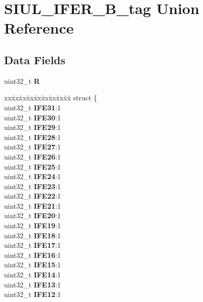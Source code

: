 \hypertarget{unionSIUL__IFER__32B__tag}{}\section{S\+I\+U\+L\+\_\+\+I\+F\+E\+R\+\_\+B\+\_\+tag Union Reference}
\label{unionSIUL__IFER__32B__tag}
\subsection*{Data Fields}
\begin{DoxyCompactItemize}
\item 
\mbox{\label{unionSIUL__IFER__32B__tag_ab50f2e33a8a047076a4418fd898069c3}} 
uint32\+\_\+t {\bfseries R}
\item 
\mbox{\label{unionSIUL__IFER__32B__tag_af816b953a23317ece501f2658c3ec8c3}} 
\begin{tabbing}
xx\=xx\=xx\=xx\=xx\=xx\=xx\=xx\=xx\=\kill
struct \{\\
\>uint32\_t {\bfseries IFE31}:1\\
\>uint32\_t {\bfseries IFE30}:1\\
\>uint32\_t {\bfseries IFE29}:1\\
\>uint32\_t {\bfseries IFE28}:1\\
\>uint32\_t {\bfseries IFE27}:1\\
\>uint32\_t {\bfseries IFE26}:1\\
\>uint32\_t {\bfseries IFE25}:1\\
\>uint32\_t {\bfseries IFE24}:1\\
\>uint32\_t {\bfseries IFE23}:1\\
\>uint32\_t {\bfseries IFE22}:1\\
\>uint32\_t {\bfseries IFE21}:1\\
\>uint32\_t {\bfseries IFE20}:1\\
\>uint32\_t {\bfseries IFE19}:1\\
\>uint32\_t {\bfseries IFE18}:1\\
\>uint32\_t {\bfseries IFE17}:1\\
\>uint32\_t {\bfseries IFE16}:1\\
\>uint32\_t {\bfseries IFE15}:1\\
\>uint32\_t {\bfseries IFE14}:1\\
\>uint32\_t {\bfseries IFE13}:1\\
\>uint32\_t {\bfseries IFE12}:1\\

\end{tabbing}
\end{DoxyCompactItemize}
